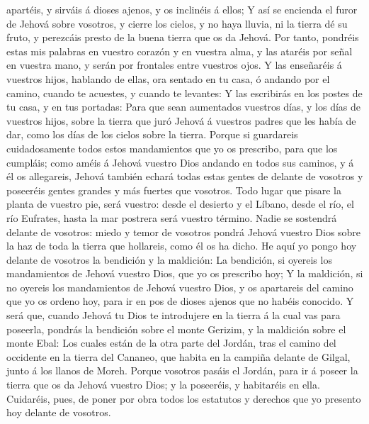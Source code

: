 apartéis, y sirváis á dioses ajenos, y os inclinéis á ellos;
 Y así se encienda el furor de Jehová sobre vosotros, y
cierre los cielos, y no haya lluvia, ni la tierra dé su fruto, y
perezcáis presto de la buena tierra que os da Jehová. 
Por tanto, pondréis estas mis palabras en vuestro corazón y en vuestra
alma, y las ataréis por señal en vuestra mano, y serán por frontales
entre vuestros ojos.  Y las enseñaréis á vuestros hijos,
hablando de ellas, ora sentado en tu casa, ó andando por el camino,
cuando te acuestes, y cuando te levantes:  Y las
escribirás en los postes de tu casa, y en tus portadas: 
Para que sean aumentados vuestros días, y los días de vuestros hijos,
sobre la tierra que juró Jehová á vuestros padres que les había de dar,
como los días de los cielos sobre la tierra.  Porque si
guardareis cuidadosamente todos estos mandamientos que yo os prescribo,
para que los cumpláis; como améis á Jehová vuestro Dios andando en todos
sus caminos, y á él os allegareis,  Jehová también echará
todas estas gentes de delante de vosotros y poseeréis gentes grandes y
más fuertes que vosotros.  Todo lugar que pisare la
planta de vuestro pie, será vuestro: desde el desierto y el Líbano,
desde el río, el río Eufrates, hasta la mar postrera será vuestro
término.  Nadie se sostendrá delante de vosotros: miedo y
temor de vosotros pondrá Jehová vuestro Dios sobre la haz de toda la
tierra que hollareis, como él os ha dicho.  He aquí yo
pongo hoy delante de vosotros la bendición y la maldición:
 La bendición, si oyereis los mandamientos de Jehová
vuestro Dios, que yo os prescribo hoy;  Y la maldición,
si no oyereis los mandamientos de Jehová vuestro Dios, y os apartareis
del camino que yo os ordeno hoy, para ir en pos de dioses ajenos que no
habéis conocido.  Y será que, cuando Jehová tu Dios te
introdujere en la tierra á la cual vas para poseerla, pondrás la
bendición sobre el monte Gerizim, y la maldición sobre el monte Ebal:
 Los cuales están de la otra parte del Jordán, tras el
camino del occidente en la tierra del Cananeo, que habita en la campiña
delante de Gilgal, junto á los llanos de Moreh.  Porque
vosotros pasáis el Jordán, para ir á poseer la tierra que os da Jehová
vuestro Dios; y la poseeréis, y habitaréis en ella. 
Cuidaréis, pues, de poner por obra todos los estatutos y derechos que yo
presento hoy delante de vosotros.

